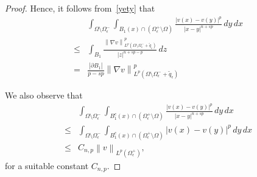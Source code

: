 \documentclass[12pt]{article}
\numberwithin{equation}{section}
\renewcommand{\leq}{\leqslant}
\begin{document}
\begin{appendix}
\begin{proof}
Hence, it follows from~\eqref{yety} that 
\begin{equation}\label{cresto}
\begin{split}
&\int_{\Omega\setminus \Omega_{\epsilon}^{-}}\int_{B_1(x)\cap \left(\Omega_{\epsilon}^{+}\setminus \Omega\right)} \frac{\left|v(x)-v(y)\right|^p}{\left|x-y\right|^{n+sp}}\,dy\,dx\\
\leq & \int_{B_1} \frac{\left\|\nabla v\right\|_{L^p(\Omega\setminus \Omega_{\epsilon}^{-}+\tilde{q}_\epsilon)}^p}{\left|z\right|^{n+sp-p}}\,dz\\
=& \frac{\left|\partial B_1\right|}{p-sp}\left\|\nabla v\right\|_{L^p(\Omega\setminus \Omega_{\epsilon}^{-}+\tilde{q}_\epsilon)}^p
\end{split}
\end{equation}

We also observe that
\begin{equation*}
\begin{split}
&\int_{\Omega\setminus \Omega_{\epsilon}^{-}}\int_{B_1^c(x)\cap \left(\Omega_{\epsilon}^{+}\setminus \Omega\right)} \frac{\left|v(x)-v(y)\right|^p}{\left|x-y\right|^{n+sp}}\,dy\,dx\\
\leq &\int_{\Omega\setminus \Omega_{\epsilon}^{-}}\int_{B_1^c(x)\cap \left(\Omega_{\epsilon}^{+}\setminus \Omega\right)}\left|v(x)-v(y)\right|^p\,dy\,dx\\
\leq & C_{n,p} \left\|v\right\|_{L^p(\Omega_{\epsilon}^{+})}, 
\end{split}
\end{equation*}
for a suitable constant $C_{n,p}$.  


\end{proof}
\end{appendix}
\end{document}
